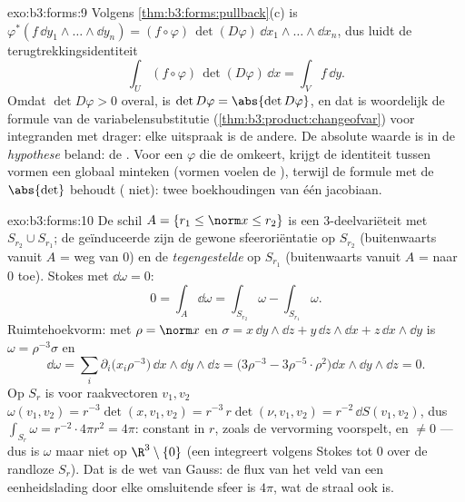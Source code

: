 \begin{solution}{exo:b3:forms:9}
Volgens \cref{thm:b3:forms:pullback}(c) is $\varphi^*(f\,\dd
y_1\wedge\dots\wedge\dd y_n) =
(f\circ\varphi)\,\det(D\varphi)\,\dd x_1\wedge\dots\wedge\dd
x_n$, dus luidt de terugtrekkingsidentiteit
\[
\int_U(f\circ\varphi)\,\det(D\varphi)\,\dd x = \int_Vf\,\dd
y .
\]
Omdat $\det D\varphi > 0$ overal, is $\det D\varphi = \abs{\det
D\varphi}$, en dat is woordelijk de formule van de
variabelensubstitutie (\cref{thm:b3:product:changeofvar}) voor
 integranden met  drager: elke uitspraak is de
andere. De absolute waarde is in de \emph{hypothese} beland: de
. Voor een $\varphi$ die de  omkeert, krijgt
de identiteit tussen vormen een globaal minteken (vormen voelen
de ), terwijl de formule met de  $\abs{\det}$
behoudt ( niet): twee boekhoudingen van één jacobiaan.
\end{solution}

\begin{solution}{exo:b3:forms:10}
De schil $A = \{r_1 \leq \norm x \leq r_2\}$ is een 
$3$-deelvariëteit met  $S_{r_2}\cup S_{r_1}$; de geïnduceerde
 zijn de gewone sfeeroriëntatie op $S_{r_2}$
(buitenwaarts vanuit $A$ = weg van $0$) en de
\emph{tegengestelde} op $S_{r_1}$ (buitenwaarts vanuit $A$ =
naar $0$ toe). Stokes met $\dd\omega = 0$:
\[
0 = \int_A\dd\omega = \int_{S_{r_2}}\omega -
\int_{S_{r_1}}\omega .
\]
Ruimtehoekvorm: met $\rho = \norm x$ en $\sigma = x\,\dd
y\wedge\dd z + y\,\dd z\wedge\dd x + z\,\dd x\wedge\dd y$ is
$\omega = \rho^{-3}\sigma$ en
\[
\dd\omega = \sum_i\partial_i\bigl(x_i\rho^{-3}\bigr)\,
\dd x\wedge\dd y\wedge\dd z
= \bigl(3\rho^{-3} - 3\rho^{-5}\cdot\rho^2\bigr)\dd
x\wedge\dd y\wedge\dd z = 0 .
\]
Op $S_r$ is voor raakvectoren $v_1, v_2$ $\omega(v_1, v_2) =
r^{-3}\det(x, v_1, v_2) = r^{-3}\,r\det(\nu, v_1, v_2) =
r^{-2}\,\dd S(v_1, v_2)$, dus $\int_{S_r}\omega = r^{-2}\cdot4\pi
r^2 = 4\pi$: constant in $r$, zoals de vervorming voorspelt, en
$\neq 0$ --- dus is $\omega$  maar niet  op
$\R^3\setminus\{0\}$ (een  integreert volgens Stokes
tot $0$ over de randloze $S_r$). Dat is de wet van Gauss: de flux
van het veld van een eenheidslading door elke omsluitende sfeer
is $4\pi$, wat de straal ook is.
\end{solution}

